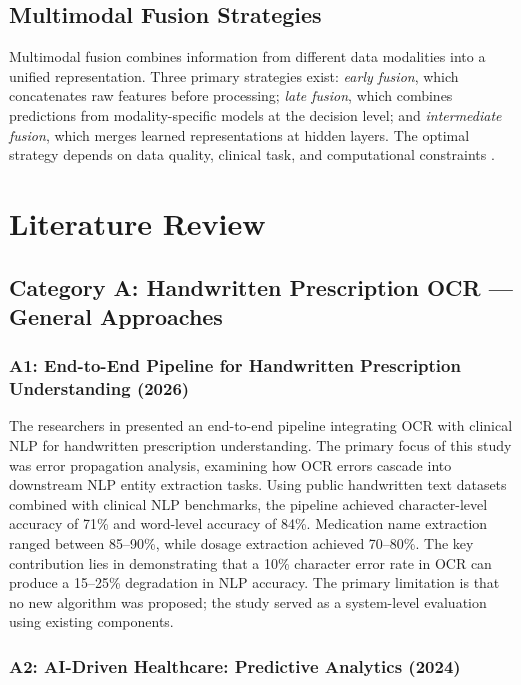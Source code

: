 \documentclass[conference]{IEEEtran}
\begin{document}
\subsection{Multimodal Fusion Strategies}

Multimodal fusion combines information from different data modalities into a unified representation. Three primary strategies exist: \textit{early fusion}, which concatenates raw features before processing; \textit{late fusion}, which combines predictions from modality-specific models at the decision level; and \textit{intermediate fusion}, which merges learned representations at hidden layers. The optimal strategy depends on data quality, clinical task, and computational constraints \cite{intuitionlabs2026pharma,mankash2024mirage}.

\section{Literature Review}
\label{sec:literature}

\subsection{Category A: Handwritten Prescription OCR --- General Approaches}

\subsubsection{A1: End-to-End Pipeline for Handwritten Prescription Understanding (2026)}

The researchers in \cite{devi2026endtoend} presented an end-to-end pipeline integrating OCR with clinical NLP for handwritten prescription understanding. The primary focus of this study was error propagation analysis, examining how OCR errors cascade into downstream NLP entity extraction tasks. Using public handwritten text datasets combined with clinical NLP benchmarks, the pipeline achieved character-level accuracy of 71\% and word-level accuracy of 84\%. Medication name extraction ranged between 85--90\%, while dosage extraction achieved 70--80\%. The key contribution lies in demonstrating that a 10\% character error rate in OCR can produce a 15--25\% degradation in NLP accuracy. The primary limitation is that no new algorithm was proposed; the study served as a system-level evaluation using existing components.

\subsubsection{A2: AI-Driven Healthcare: Predictive Analytics (2024)}
\end{document}
